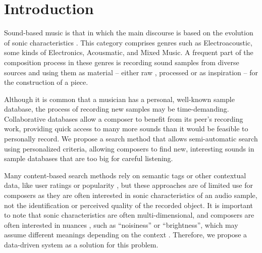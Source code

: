 \documentclass{article}
\title{\papertitle}
\begin{document}
%
\capstartfalse
\maketitle
\capstarttrue
%
\begin{abstract}
We propose a search method, namely Query-by-Multiple-Examples, that is
able to search, within an audio sample 
database, for a particular sonic characteristic. The characteristic is
learned on-the-fly by means of multiple examples provided by a human
user, thus avoiding ambiguities due to manual labelling. We evaluate
four variations of the proposed method using ground truth provided
by three musicians. It is shown that, for queries based on sonic
characteristics, the query modelling process yields more correct
results than if several single-example queries were executed in
parallel using the same input data.
\end{abstract}
%

\section{Introduction}\label{sec:introduction}
Sound-based music is that in which the main discourse is
based on the evolution of sonic characteristics
\cite{Solomos2013}. This category 
comprises genres such as Electroacoustic, some kinds of Electronics,
Acousmatic, and Mixed Music. A frequent part of the composition 
process in these genres is recording sound samples from diverse
sources and using them as material -- either raw \cite{Schwarz2005},
processed \cite{Opie2003} or as
inspiration \cite{Nouno2009} -- for the construction of a piece.

Although it is common that a musician has a personal, well-known
sample database, the process of recording new samples may be
time-demanding. Collaborative databases allow a composer to
benefit from its peer's recording work, providing quick access to
many more sounds than it would be feasible to personally
record. We propose a search method that allows
semi-automatic search using personalized criteria, allowing composers
to find new, interesting 
sounds in sample databases that are too big for careful listening.

Many content-based search methods rely on semantic tags
\cite{Platt2002,Pauws2002,Kodama2005,Shao2009,Jensen2012,Bogdanov2013}
or other contextual data, like user ratings or popularity
\cite{Knees2013}, but these approaches are of limited use for
composers as they are often interested in sonic characteristics of an
audio sample, not the identification or perceived quality of the
recorded object. It is important to note that sonic
characteristics are often multi-dimensional, and composers are often
interested in nuances \cite{Moravec2005}, such as ``noisiness'' or ``brightness'', which may assume different meanings depending on the context
\cite{Sarkar2007}. Therefore, we 
propose a data-driven system as a solution for this problem.
\end{document}
